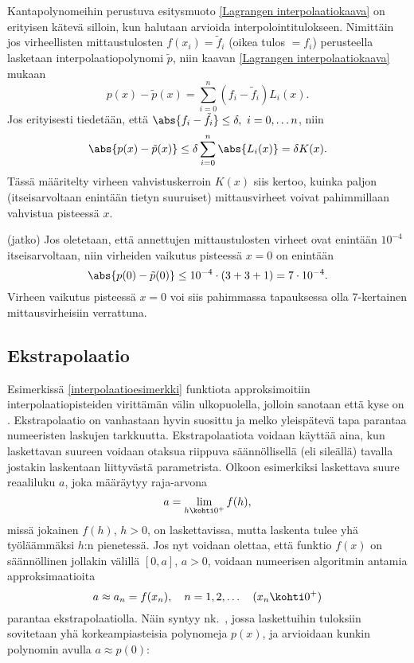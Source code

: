 Kantapolynomeihin perustuva esitysmuoto \eqref{Lagrangen interpolaatiokaava} on erityisen
kätevä silloin, kun halutaan arvioida  interpolointitulokseen. 
Nimittäin jos virheellisten mittaustulosten $f(x_i)=\tilde{f}_i$ (oikea tulos $=f_i$)
perusteella lasketaan interpolaatiopolynomi $\tilde{p}$, niin kaavan
\eqref{Lagrangen interpolaatiokaava} mukaan
\[ 
p(x)-\tilde{p}(x) = \sum_{i=0}^n (f_i-\tilde{f}_i) L_i(x). 
\]
Jos erityisesti tiedetään, että $\abs{f_i-\tilde{f}_i} \le \delta,\ i=0,\ldots n$, niin
\[ 
\abs{p(x)-\tilde{p}(x)} \le \delta \sum_{i=0}^n \abs{L_i(x)} = \delta K(x). 
\]
Tässä määritelty virheen vahvistuskerroin $K(x)$ siis kertoo, kuinka paljon (itseis\-arvoltaan 
enintään tietyn suuruiset) mittausvirheet voivat pahimmillaan vahvistua pisteessä $x$.
\jatko \begin{Exa} (jatko) Jos oletetaan, että annettujen mittaustulosten virheet ovat enintään
$10^{-4}$ itseisarvoltaan, niin virheiden vaikutus pisteessä $x=0$ on enintään
\[ 
\abs{p(0) - \tilde{p}(0)} \le 10^{-4} \cdot (3+3+1) = 7 \cdot 10^{-4}. 
\]
Virheen vaikutus pisteessä $x=0$ voi siis pahimmassa tapauksessa olla $7$-kertainen
mittausvirheisiin verrattuna. \loppu
\end{Exa}

\subsection*{Ekstrapolaatio}

Esimerkissä \ref{interpolaatioesimerkki} funktiota approksimoitiin interpolaatiopisteiden 
virittämän välin ulkopuolella, jolloin sanotaan että kyse on . 
Ekstrapolaatio on vanhastaan hyvin suosittu ja melko yleispätevä tapa parantaa numeeristen 
laskujen tarkkuutta. Ekstrapolaatiota voidaan käyttää aina, kun laskettavan suureen voidaan 
otaksua riippuva säännöllisellä (eli sileällä) tavalla jostakin laskentaan liittyvästä 
parametrista. Olkoon esimerkiksi laskettava suure reaaliluku $a$, joka määräytyy raja-arvona
\[
a=\lim_{h\kohti 0^+} f(h),
\]
missä jokainen $f(h)$, $h>0$, on laskettavissa, mutta laskenta tulee yhä työläämmäksi $h$:n 
pienetessä. Jos nyt voidaan olettaa, että funktio $f(x)$ on säännöllinen jollakin välillä 
$[0,a]$, $a>0$, voidaan numeerisen algoritmin antamia approksimaatioita
\[
a\approx a_n=f(x_n),\quad n=1,2,\ldots\quad (x_n\kohti 0^+)
\]
parantaa ekstrapolaatiolla. Näin syntyy nk.\ , jossa laskettuihin 
tuloksiin sovitetaan yhä korkeampiasteisia polynomeja $p(x)$, ja arvioidaan kunkin polynomin
avulla $a\approx p(0)$:

